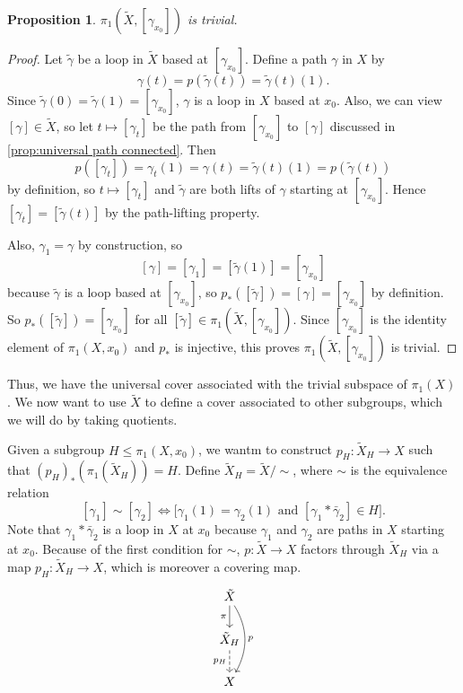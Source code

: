 \documentclass{article}
\newtheorem{prop}[thm]{Proposition}
\theoremstyle{definition}
\theoremstyle{remark}
\numberwithin{figure}{section}
\begin{document}
\begin{prop}
	$\pi_1(\tilde X, [\gamma_{x_0}])$ is trivial.
\end{prop}

\begin{proof}
	Let $\tilde\gamma$ be a loop in $\tilde X$ based at $[\gamma_{x_0}]$. Define a path $\gamma$ in $X$ by
	\[
	\gamma(t) = p(\tilde\gamma(t)) = \tilde\gamma(t)(1).
	\]
	Since $\tilde\gamma(0) = \tilde\gamma(1) = [\gamma_{x_0}]$, $\gamma$ is a loop in $X$ based at $x_0$. Also, we can view $[\gamma] \in \tilde X$, so let $t \mapsto [\gamma_t]$ be the path from $[\gamma_{x_0}]$ to $[\gamma]$ discussed in \cref{prop:universal path connected}. Then
	\[
	p([\gamma_t]) = \gamma_t(1) = \gamma(t) = \tilde\gamma(t)(1) = p(\tilde\gamma(t))
	\]
	by definition, so $t \mapsto [\gamma_t]$ and $\tilde\gamma$ are both lifts of $\gamma$ starting at $[\gamma_{x_0}]$. Hence $[\gamma_t] = [\tilde\gamma(t)]$ by the path-lifting property.
	
	Also, $\gamma_1 = \gamma$ by construction, so
	\[
	[\gamma] = [\gamma_1] = [\tilde\gamma(1)] = [\gamma_{x_0}]
	\]
	because $\tilde\gamma$ is a loop based at $[\gamma_{x_0}]$, so $p_*([\tilde\gamma]) = [\gamma] = [\gamma_{x_0}]$ by definition. So $p_*([\tilde\gamma]) = [\gamma_{x_0}]$ for all $[\tilde\gamma] \in \pi_1(\tilde X, [\gamma_{x_0}])$. Since $[\gamma_{x_0}]$ is the identity element of $\pi_1(X, x_0)$ and $p_*$ is injective, this proves $\pi_1(\tilde X, [\gamma_{x_0}])$ is trivial.
\end{proof}

Thus, we have the universal cover associated with the trivial subspace of $\pi_1(X)$. We now want to use $\tilde X$ to define a cover associated to other subgroups, which we will do by taking quotients.

Given a subgroup $H \leq \pi_1(X, x_0)$, we wantm to construct $p_H : \tilde X_H \to X$ such that $(p_H)_*(\pi_1(\tilde X_H)) = H$. Define $\tilde X_H = \tilde X/\sim$, where $\sim$ is the equivalence relation
\[
[\gamma_1] \sim [\gamma_2] \iff \big[ \gamma_1(1) = \gamma_2(1) \text{ and } [\gamma_1 * \bar\gamma_2] \in H \big].
\]
Note that $\gamma_1 * \bar\gamma_2$ is a loop in $X$ at $x_0$ because $\gamma_1$ and $\gamma_2$ are paths in $X$ starting at $x_0$. Because of the first condition for $\sim$, $p : \tilde X \to X$ factors through $\tilde X_H$ via a map $p_H : \tilde X_H \to X$, which is moreover a covering map.
\[
\begin{tikzcd}
	\tilde X \ar[d, "\pi"'] \ar[dd, bend left, "p"]\\
	\tilde X_H \ar[d, dashed, "p_H"']\\
	X
\end{tikzcd}
\]
\end{document}
